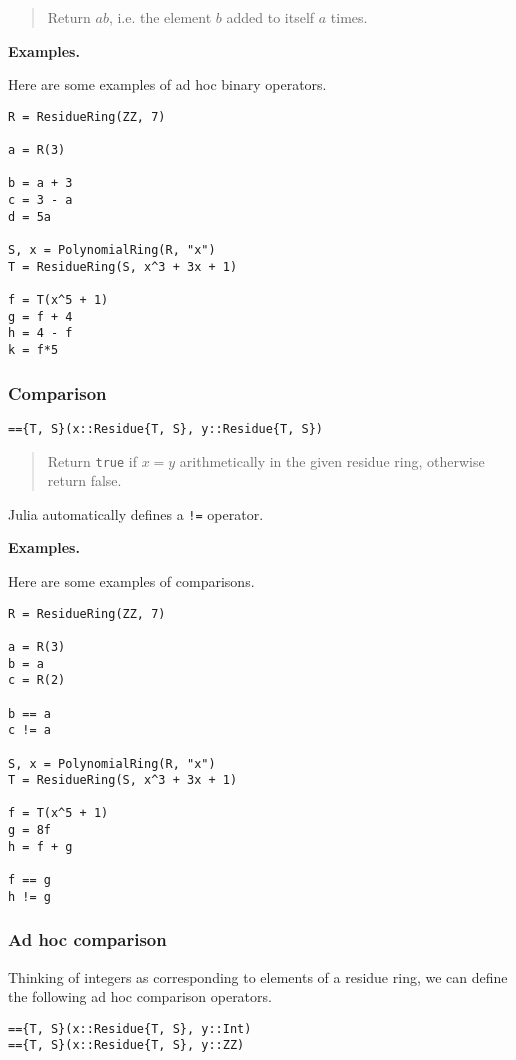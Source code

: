 \documentclass[a4paper,10pt]{article}
\newcommand{\code}{\lstinline}
\newcommand{\desc}[1]{\vspace{-3mm}\begin{quote}#1\end{quote}}
\begin{document}
{{{\desc{Return $ab$, i.e. the element $b$ added to itself $a$ times.}

\textbf{Examples.}

Here are some examples of ad hoc binary operators.

\begin{lstlisting}
R = ResidueRing(ZZ, 7)

a = R(3)

b = a + 3
c = 3 - a
d = 5a

S, x = PolynomialRing(R, "x")
T = ResidueRing(S, x^3 + 3x + 1)

f = T(x^5 + 1)
g = f + 4
h = 4 - f
k = f*5
\end{lstlisting}

\subsubsection{Comparison}

\begin{lstlisting}
=={T, S}(x::Residue{T, S}, y::Residue{T, S})
\end{lstlisting}

\desc{Return \code{true} if $x = y$ arithmetically in the given residue ring, 
otherwise return false.}

Julia automatically defines a \code{!=} operator.

\textbf{Examples.}

Here are some examples of comparisons.

\begin{lstlisting}
R = ResidueRing(ZZ, 7)

a = R(3)
b = a
c = R(2)

b == a
c != a

S, x = PolynomialRing(R, "x")
T = ResidueRing(S, x^3 + 3x + 1)

f = T(x^5 + 1)
g = 8f
h = f + g

f == g
h != g
\end{lstlisting}

\subsubsection{Ad hoc comparison}

Thinking of integers as corresponding to elements of a residue ring, we
can define the following ad hoc comparison operators.

\begin{lstlisting}
=={T, S}(x::Residue{T, S}, y::Int)
=={T, S}(x::Residue{T, S}, y::ZZ)
\end{lstlisting}

}}}
\end{document}
